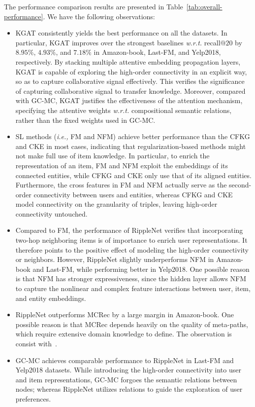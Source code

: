 \documentclass[sigconf]{acmart}
\newcommand{\ie}{\emph{i.e., }}
\newcommand{\wrt}{\emph{w.r.t. }}
\theoremstyle{definition}
\begin{document}
The performance comparison results are presented in Table~\ref{tab:overall-performance}. We have the following observations:
\begin{itemize}[leftmargin=*]
    \item KGAT consistently yields the best performance on all the datasets. In particular, KGAT improves over the strongest baselines \wrt recall@$20$ by $8.95\%$, $4.93\%$, and $7.18\%$ in Amazon-book, Last-FM, and Yelp2018, respectively.
    By stacking multiple attentive embedding propagation layers, KGAT is capable of exploring the high-order connectivity in an explicit way, so as to capture collaborative signal effectively.
    This verifies the significance of capturing collaborative signal to transfer knowledge.
    Moreover, compared with GC-MC, KGAT justifies the effectiveness of the attention mechanism, specifying the attentive weights \wrt compositional semantic relations, rather than the fixed weights used in GC-MC.
    
    \item SL methods (\ie FM and NFM) achieve better performance than the CFKG and CKE in most cases, indicating that regularization-based methods might not make full use of item knowledge. In particular, to enrich the representation of an item, FM and NFM exploit the embeddings of its connected entities, while CFKG and CKE only use that of its aligned entities. Furthermore, the cross features in FM and NFM actually serve as the second-order connectivity between users and entities, whereas CFKG and CKE model connectivity on the granularity of triples, leaving high-order connectivity untouched.
    


    \item Compared to FM, the performance of RippleNet verifies that incorporating two-hop neighboring items is of importance to enrich user representations. It therefore points to the positive effect of modeling the high-order connectivity or neighbors. However, RippleNet slightly underperforms NFM in Amazon-book and Last-FM, while performing better in Yelp2018.
    One possible reason is that NFM has stronger expressiveness, since the hidden layer allows NFM to capture the nonlinear and complex feature interactions between user, item, and entity embeddings.
    
    \item RippleNet outperforms MCRec by a large margin in Amazon-book. One possible reason is that MCRec depends heavily on the quality of meta-paths, which require extensive domain knowledge to define. The observation is consist with~\cite{RippleNet}.
    
    \item GC-MC achieves comparable performance to RippleNet in Last-FM and Yelp2018 datasets. While introducing the high-order connectivity into user and item representations, GC-MC forgoes the semantic relations between nodes; whereas RippleNet utilizes relations to guide the exploration of user preferences.
    
    
\end{itemize}
\end{document}
